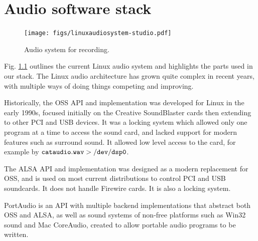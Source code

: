 \documentclass[oneside,english]{scrbook}
\begin{document}
\chapter{Audio software stack}

\begin{figure}
  \centering
  \texttt{[image: figs/linuxaudiosystem-studio.pdf]}
  \caption{Audio system for recording.}
  \label{fig:audio-rec}
\end{figure}

Fig. \ref{fig:audio-rec} outlines the current Linux audio system and highlights the parts used in our stack.  The Linux audio architecture has grown quite complex in recent years, with multiple ways of doing things competing and improving.

Historically, the OSS API and implementation was developed for Linux in the early 1990s, focused initially on the Creative SoundBlaster cards then extending to other PCI and USB devices.  It was a locking system which allowed only one program at a time to access the sound card, and lacked support for modern features such as surround sound. It allowed low level access to the card, for example by $\tt cat audio.wav > /dev/dsp0$.  

The ALSA API and implementation was designed as a modern replacement for OSS, and is used on most current distributions to control PCI and USB soundcards.  It does not handle Firewire cards. It is also a locking system.

PortAudio is an API with multiple backend implementations that abstract both OSS and ALSA, as well as sound systems of non-free platforms such as Win32 sound and Mac CoreAudio, created to allow portable audio programs to be written.  
\end{document}
